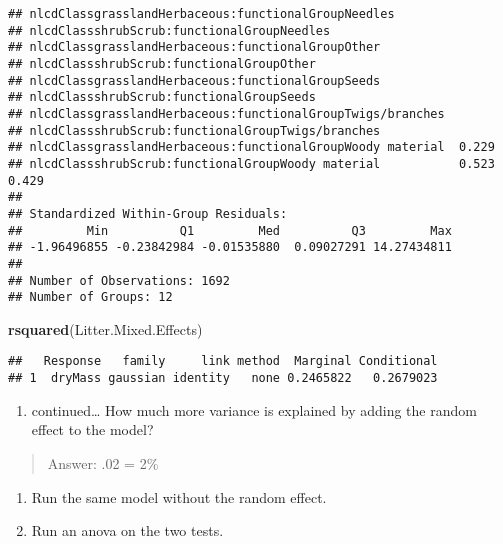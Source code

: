 \documentclass[]{article}
\newenvironment{Shaded}{\begin{snugshade}}{\end{snugshade}}
\newcommand{\KeywordTok}[1]{\textcolor[rgb]{0.13,0.29,0.53}{\textbf{#1}}}
\newcommand{\NormalTok}[1]{#1}
\providecommand{\tightlist}{%
  \setlength{\itemsep}{0pt}\setlength{\parskip}{0pt}}
\begin{document}
\begin{verbatim}
## nlcdClassgrasslandHerbaceous:functionalGroupNeedles                     
## nlcdClassshrubScrub:functionalGroupNeedles                              
## nlcdClassgrasslandHerbaceous:functionalGroupOther                       
## nlcdClassshrubScrub:functionalGroupOther                                
## nlcdClassgrasslandHerbaceous:functionalGroupSeeds                       
## nlcdClassshrubScrub:functionalGroupSeeds                                
## nlcdClassgrasslandHerbaceous:functionalGroupTwigs/branches              
## nlcdClassshrubScrub:functionalGroupTwigs/branches                       
## nlcdClassgrasslandHerbaceous:functionalGroupWoody material  0.229       
## nlcdClassshrubScrub:functionalGroupWoody material           0.523  0.429
## 
## Standardized Within-Group Residuals:
##         Min          Q1         Med          Q3         Max 
## -1.96496855 -0.23842984 -0.01535880  0.09027291 14.27434811 
## 
## Number of Observations: 1692
## Number of Groups: 12
\end{verbatim}

\begin{Shaded}
\begin{Highlighting}[]
\KeywordTok{rsquared}\NormalTok{(Litter.Mixed.Effects)}
\end{Highlighting}
\end{Shaded}

\begin{verbatim}
##   Response   family     link method  Marginal Conditional
## 1  dryMass gaussian identity   none 0.2465822   0.2679023
\end{verbatim}

\begin{enumerate}
\def\labelenumi{\alph{enumi}.}
\setcounter{enumi}{1}
\tightlist
\item
  continued\ldots{} How much more variance is explained by adding the
  random effect to the model?
\end{enumerate}

\begin{quote}
Answer: .02 = 2\%
\end{quote}

\begin{enumerate}
\def\labelenumi{\alph{enumi}.}
\setcounter{enumi}{2}
\tightlist
\item
  Run the same model without the random effect.
\item
  Run an anova on the two tests.
\end{enumerate}
\end{document}
